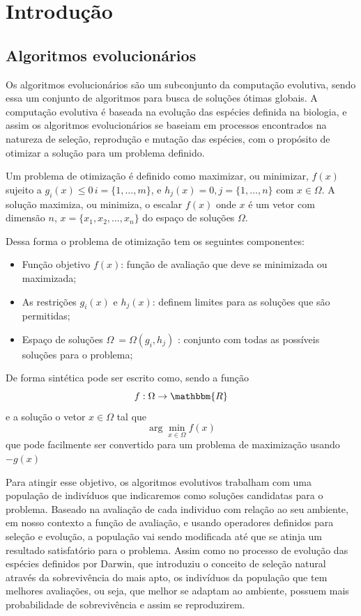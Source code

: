 %
\chapter{Introdução}
\label{chap:introducao}

\section{Algoritmos evolucionários}

Os algoritmos evolucionários são um subconjunto da computação evolutiva, sendo essa um conjunto de algoritmos para busca de soluções ótimas globais. A computação evolutiva é baseada na evolução das espécies definida na biologia, e assim os algoritmos evolucionários se baseiam em processos encontrados na natureza de seleção, reprodução e mutação das espécies, com o propósito de otimizar a solução para um problema definido.

Um problema de otimização é definido como maximizar, ou minimizar, $f(x)$ sujeito a \(g_i(x) \leq 0\,i = \{1,\ldots, m\}\), e \(h_j(x) = 0, j=\{1,\ldots,n\}\) com \(x \in \Omega \). A solução maximiza, ou minimiza, o escalar \(f(x)\) onde \(x\) é um vetor com dimensão \(n\), \(x=\{x_1,x_2,\ldots,x_n\}\) do espaço de soluções \(\Omega\). \cite{Coello2007} 

Dessa forma o problema de otimização tem os seguintes componentes:
\begin{itemize}
	\item Função objetivo \(f(x)\): função de avaliação que deve se minimizada ou maximizada;
	\item As restrições \(g_i(x)\) e \(h_j(x)\): definem limites para as soluções que são permitidas;
	\item Espaço de soluções \(\Omega\ = \Omega(g_i,h_j)\) : conjunto com todas as possíveis soluções para o problema; 
\end{itemize}

De forma sintética pode ser escrito como, sendo a função \[ f: \Omega \to \mathbbm{R}\] e a solução o vetor \(x \in \Omega\) tal que \[ \arg \min \limits_{x \in \Omega} f(x)\] que pode facilmente ser convertido para um problema de maximização usando \(-g(x)\)

Para atingir esse objetivo, os algoritmos evolutivos trabalham com uma população de indivíduos que indicaremos como soluções candidatas para o problema. Baseado na avaliação de cada individuo com relação ao seu ambiente, em nosso contexto a função de avaliação, e usando operadores definidos para seleção e evolução, a população vai sendo modificada até que se atinja um resultado satisfatório para o problema. Assim como no processo de evolução das espécies definidos por Darwin, que introduziu o conceito de seleção natural  através da sobrevivência do mais apto, os indivíduos da população que tem melhores avaliações, ou seja, que melhor se adaptam ao ambiente, possuem mais probabilidade de sobrevivência e assim se reproduzirem. 

